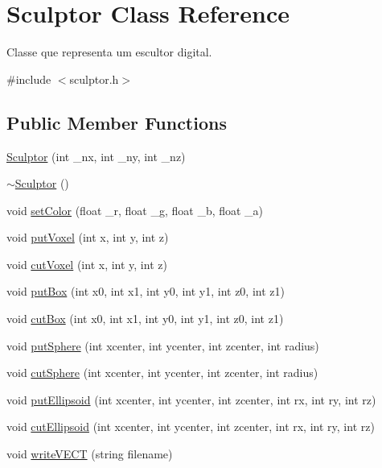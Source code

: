 \hypertarget{classSculptor}{}\section{Sculptor Class Reference}
\label{classSculptor}


Classe que representa um escultor digital.  




{\ttfamily \#include $<$sculptor.\+h$>$}

\subsection*{Public Member Functions}
\begin{DoxyCompactItemize}
\item 
\mbox{\hyperlink{classSculptor_a014e3ef5517bf0e9d9e14486b6ac6433}{Sculptor}} (int \+\_\+nx, int \+\_\+ny, int \+\_\+nz)
\item 
\mbox{\hyperlink{classSculptor_a8f159bf97458326f16d2e238e11be7ff}{$\sim$\+Sculptor}} ()
\item 
void \mbox{\hyperlink{classSculptor_a5723e671e073ac310b6f385a7fdc9f9f}{set\+Color}} (float \+\_\+r, float \+\_\+g, float \+\_\+b, float \+\_\+a)
\item 
void \mbox{\hyperlink{classSculptor_a4bdea3048b419d58e93074060eaa7b52}{put\+Voxel}} (int x, int y, int z)
\item 
void \mbox{\hyperlink{classSculptor_ad9d714a35fc8ae16d06eb5df37c3493c}{cut\+Voxel}} (int x, int y, int z)
\item 
void \mbox{\hyperlink{classSculptor_a311ad7a0fb83fc67ac1f378be8e99fe1}{put\+Box}} (int x0, int x1, int y0, int y1, int z0, int z1)
\item 
void \mbox{\hyperlink{classSculptor_aa84a1b12b09e9e103fc8d78f8d1bc00f}{cut\+Box}} (int x0, int x1, int y0, int y1, int z0, int z1)
\item 
void \mbox{\hyperlink{classSculptor_a794a2b6ee8fc8098fd6150cb46101fc6}{put\+Sphere}} (int xcenter, int ycenter, int zcenter, int radius)
\item 
void \mbox{\hyperlink{classSculptor_a67ab8c0ba5116adb8af1d01ad373ac15}{cut\+Sphere}} (int xcenter, int ycenter, int zcenter, int radius)
\item 
void \mbox{\hyperlink{classSculptor_a093615b0c2b9b3a17a56300b9b939f39}{put\+Ellipsoid}} (int xcenter, int ycenter, int zcenter, int rx, int ry, int rz)
\item 
void \mbox{\hyperlink{classSculptor_a18d2922c111c4c13653ee07d878151ad}{cut\+Ellipsoid}} (int xcenter, int ycenter, int zcenter, int rx, int ry, int rz)
\item 
void \mbox{\hyperlink{classSculptor_a200442de17ed45b7a1ece728145a2ddf}{write\+V\+E\+CT}} (string filename)
\end{DoxyCompactItemize}
